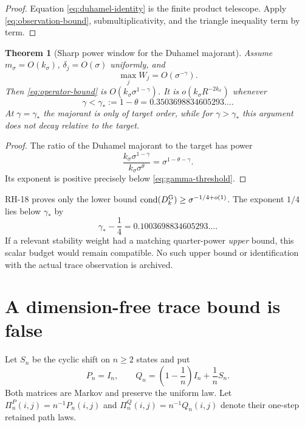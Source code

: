 \documentclass[11pt]{article}
\newtheorem{theorem}{Theorem}[section]
\theoremstyle{remark}
\begin{document}
\begin{proof}
Equation \eqref{eq:duhamel-identity} is the finite product telescope.
Apply \eqref{eq:observation-bound}, submultiplicativity, and the triangle
inequality term by term.
\end{proof}

\begin{theorem}[Sharp power window for the Duhamel majorant]
\label{thm:power-window}
Assume $m_\sigma=O(k_\sigma)$, $\delta_j=O(\sigma)$ uniformly, and
\begin{equation}
 \max_jW_j=O(\sigma^{-\gamma}).
 \label{eq:weight-growth}
\end{equation}
Then \eqref{eq:operator-bound} is
$O(k_\sigma\sigma^{1-\gamma})$.  It is
$o(k_\sigma R^{-2k_\sigma})$ whenever
\begin{equation}
 \boxed{
 \gamma<\gamma_*:=1-\theta
 =0.3503698834605293\ldots .}
 \label{eq:gamma-threshold}
\end{equation}
At $\gamma=\gamma_*$ the majorant is only of target order, while for
$\gamma>\gamma_*$ this argument does not decay relative to the target.
\end{theorem}

\begin{proof}
The ratio of the Duhamel majorant to the target has power
\begin{equation}
 \frac{k_\sigma\sigma^{1-\gamma}}
 {k_\sigma\sigma^\theta}
 =\sigma^{1-\theta-\gamma}.
\end{equation}
Its exponent is positive precisely below \eqref{eq:gamma-threshold}.
\end{proof}

RH-18 proves only the lower bound
$\operatorname{cond}(D_k^{\rm G})\ge\sigma^{-1/4+o(1)}$.  The exponent
$1/4$ lies below $\gamma_*$ by
\begin{equation}
 \gamma_*-\frac14=0.1003698834605293\ldots .
 \label{eq:quarter-slack}
\end{equation}
If a relevant stability weight had a matching quarter-power \emph{upper}
bound, this scalar budget would remain compatible.  No such upper bound or
identification with the actual trace observation is archived.

\section{A dimension-free trace bound is false}

Let $S_n$ be the cyclic shift on $n\ge2$ states and put
\begin{equation}
 P_n=I_n,
 \qquad
 Q_n=\left(1-\frac1n\right)I_n+\frac1nS_n.
 \label{eq:trace-example}
\end{equation}
Both matrices are Markov and preserve the uniform law.
Let $\Pi_n^P(i,j)=n^{-1}P_n(i,j)$ and
$\Pi_n^Q(i,j)=n^{-1}Q_n(i,j)$ denote their one-step retained path laws.
\end{document}
